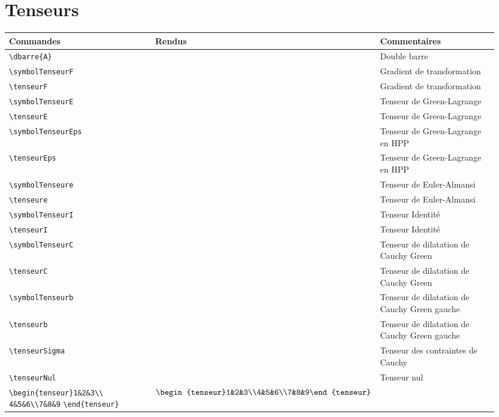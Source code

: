 \documentclass[a4paper,10pt]{article}
\begin{document}
	\section{Tenseurs}
	\noindent
	\begin{tabular}{|p{0.35\linewidth}|p{0.3\linewidth}|p{0.3\linewidth}|}
		\hline
			\textbf{Commandes}&\textbf{Rendus}&\textbf{Commentaires}
		\\\hline\hline
			\verb!\dbarre{A}!			&	\dbarre{A}			&	Double barre
		\\\hline
			\verb!\symbolTenseurF!			&	\symbolTenseurF			&	Gradient de transformation
		\\\hline
			\verb!\tenseurF!		&	\tenseurF			&	Gradient de transformation
		\\\hline
			\verb!\symbolTenseurE!		&	\symbolTenseurE			&	Tenseur de Green-Lagrange
		\\\hline
			\verb!\tenseurE!		&	\tenseurE			&	Tenseur de Green-Lagrange
		\\\hline
			\verb!\symbolTenseurEps!		&	\symbolTenseurEps			&	Tenseur de Green-Lagrange en HPP
		\\\hline
			\verb!\tenseurEps!		&	\tenseurEps			&	Tenseur de Green-Lagrange en HPP
		\\\hline
			\verb!\symbolTenseure!		&	\symbolTenseure			&	Tenseur de Euler-Almansi
		\\\hline
			\verb!\tenseure!		&	\tenseure			&	Tenseur de Euler-Almansi
		\\\hline
			\verb!\symbolTenseurI!		&	\symbolTenseurI			&	Tenseur Identité
		\\\hline
			\verb!\tenseurI!		&	\tenseurI			&	Tenseur Identité
		\\\hline
			\verb!\symbolTenseurC!		&	\symbolTenseurC			&	Tenseur de dilatation de Cauchy Green
		\\\hline
			\verb!\tenseurC!		&	\tenseurC			&	Tenseur de dilatation de Cauchy Green
		\\\hline
			\verb!\symbolTenseurb!		&	\symbolTenseurb			&	Tenseur de dilatation de Cauchy Green gauche
		\\\hline
			\verb!\tenseurb!		&	\tenseurb			&	Tenseur de dilatation de Cauchy Green gauche
		\\\hline
			\verb!\tenseurSigma!		&	\tenseurSigma			&	Tenseur des contraintes de Cauchy
		\\\hline
			\verb!\tenseurNul!		&	\tenseurNul			&	Tenseur nul
		\\\hline
			\verb!\begin{tenseur}1&2&3\\!
			\verb!4&5&6\\7&8&9!
			\verb!\end{tenseur}!		&	$\begin{tenseur}1&2&3\\4&5&6\\7&8&9\end{tenseur}$			&	
		\\\hline
	\end{tabular}
\end{document}
